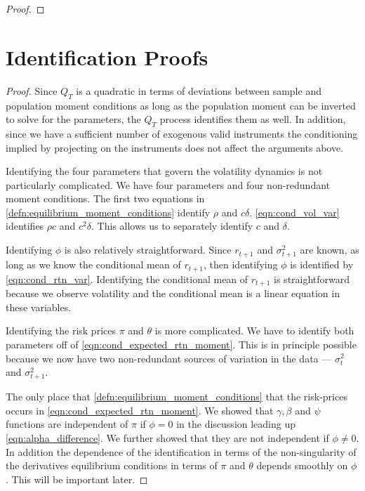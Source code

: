 \documentclass[11pt, letterpaper, twoside, final]{article}
\begin{document}
\begin{appendices}
\begin{proof}
\end{proof}


\section{Identification Proofs}


\identifiedSet*

\begin{proof}
    Since $Q_{T}$ is a quadratic in terms of deviations between sample and population moment conditions as long as
    the population moment can be inverted to solve for the parameters, the $Q_T$ process identifies them as well. 
    In addition, since we have a sufficient number of exogenous valid instruments the conditioning implied by
    projecting on the instruments does not affect the arguments above. 

    Identifying the four parameters that govern the volatility dynamics is not particularly complicated. 
    We have four parameters and four non-redundant moment conditions.
    The first two equations in    \cref{defn:equilibrium_moment_conditions} identify $\rho$ and $c \delta$.
    \cref{eqn:cond_vol_var} identifies $\rho c$ and $c^2 \delta$. 
    This allows us to separately identify $c$ and $\delta$.
    
    Identifying $\phi$ is also relatively straightforward. Since $r_{t+1}$ and $\sigma^2_{t+1}$ are known, as long
    as we know the conditional mean of $r_{t+1}$, then identifying $\phi$ is identified by \cref{eqn:cond_rtn_var}.
    Identifying the conditional mean of $r_{t+1}$ is straightforward because we observe volatility and the
    conditional mean is a linear equation in these variables. 
    

    Identifying the risk prices $\pi$ and $\theta$ is more complicated.
    We have to identify both parameters off of \cref{eqn:cond_expected_rtn_moment}. 
    This is in principle possible because we now have two non-redundant sources of variation in the data ---
    $\sigma^2_t$ and $\sigma^2_{t+1}$.

    The only place that \cref{defn:equilibrium_moment_conditions} that the risk-prices occurs in
    \cref{eqn:cond_expected_rtn_moment}. 
    We showed that $\gamma, \beta$ and $\psi$ functions are independent of $\pi$ if $\phi = 0$ in the discussion
    leading up \cref{eqn:alpha_difference}.
    We further showed that they are not independent if $\phi \neq 0$.
    In addition the dependence of the identification in terms of the non-singularity of the derivatives
    equilibrium conditions in terms of $\pi$ and $\theta$ depends smoothly on $\phi$. 
    This will be important later.
    

\end{proof}
\end{appendices}
\end{document}
